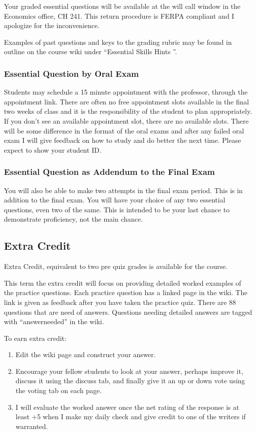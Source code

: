 \documentclass[letterpaper,10pt]{article}
\begin{document}
Your graded essential questions will be available at the will call window in the Economics office, CH 241.  This return procedure is FERPA compliant and I apologize for the inconvenience.

Examples of past questions and keys to the grading rubric may be found
in outline on the course wiki under ``Essential Skills Hints ''.

\subsubsection{Essential Question by Oral Exam}

Students may schedule a 15 minute appointment with the professor, through the appointment link. There are often no free appointment slots available in the final two weeks of class and it is the responsibility of the student to plan appropriately. If you don’t see an available appointment slot, there are no available slots. There will be some difference in the format of the oral exams and after any failed oral exam I will give feedback on how to study and do better the next time. Please expect to show your student ID.

\subsubsection{ Essential Question as Addendum to the Final Exam}
You will also be able to make two attempts in the final exam period. This is in addition to the final exam. You will have your choice of any two essential questions, even two of the same. This is intended to be your last chance to demonstrate proficiency, not the main chance.

\subsection{Extra Credit}\label{sec:ExtraCredit}
Extra Credit, equivalent to two pre quiz grades is available for the
course.  

This term the extra credit will focus on providing detailed worked examples of the practice questions.  Each practice question has a linked page in the wiki.  The link is given as feedback after you have taken the practice quiz.  There are 88 questions that are need of answers.  Questions needing detailed answers are tagged with ``answerneeded'' in the wiki.

To earn extra credit:
\begin{enumerate}
    
    
    \item Edit the wiki page and construct your answer.
    
    \item Encourage your fellow students to look at your answer, perhaps improve it, discuss it using the discuss tab, and finally give it an up or down vote using the voting tab on each page.  
    
    \item I will evaluate the worked answer once the net rating of the response is at least +5 when I make my daily check and give credit to one of the writers if warranted.

\end{enumerate}
\end{document}
